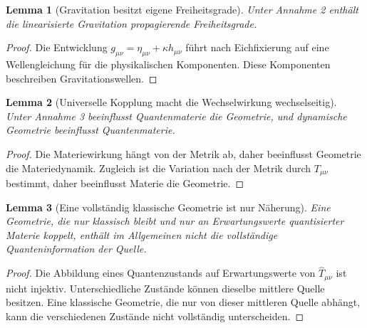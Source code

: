 \documentclass[11pt,a4paper,openany]{book}
\newtheorem{lemma}{Lemma}[chapter]
\theoremstyle{remark}
\begin{document}
\begin{lemma}[Gravitation besitzt eigene Freiheitsgrade]
Unter Annahme 2 enthält die linearisierte Gravitation propagierende Freiheitsgrade.
\end{lemma}
\begin{proof}
Die Entwicklung $g_{\mu\nu}=\eta_{\mu\nu}+\kappa h_{\mu\nu}$ führt nach Eichfixierung auf eine Wellengleichung für die physikalischen Komponenten. Diese Komponenten beschreiben Gravitationswellen.
\end{proof}

\begin{lemma}[Universelle Kopplung macht die Wechselwirkung wechselseitig]
Unter Annahme 3 beeinflusst Quantenmaterie die Geometrie, und dynamische Geometrie beeinflusst Quantenmaterie.
\end{lemma}
\begin{proof}
Die Materiewirkung hängt von der Metrik ab, daher beeinflusst Geometrie die Materiedynamik. Zugleich ist die Variation nach der Metrik durch $T_{\mu\nu}$ bestimmt, daher beeinflusst Materie die Geometrie.
\end{proof}

\begin{lemma}[Eine vollständig klassische Geometrie ist nur Näherung]
Eine Geometrie, die nur klassisch bleibt und nur an Erwartungswerte quantisierter Materie koppelt, enthält im Allgemeinen nicht die vollständige Quanteninformation der Quelle.
\end{lemma}
\begin{proof}
Die Abbildung eines Quantenzustands auf Erwartungswerte von $\hat T_{\mu\nu}$ ist nicht injektiv. Unterschiedliche Zustände können dieselbe mittlere Quelle besitzen. Eine klassische Geometrie, die nur von dieser mittleren Quelle abhängt, kann die verschiedenen Zustände nicht vollständig unterscheiden.
\end{proof}
\end{document}
